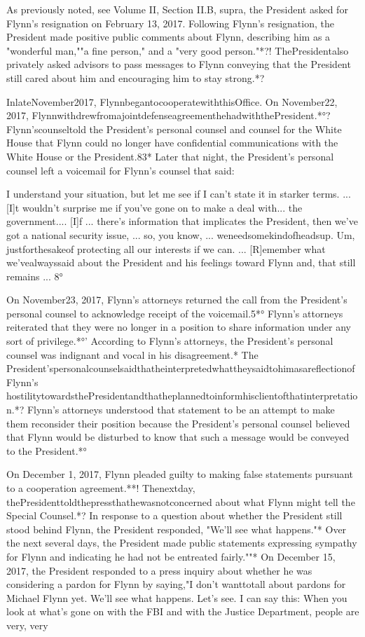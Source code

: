 As previously noted, see Volume II, Section II.B, supra, the President asked for Flynn's resignation on February 13, 2017.
Following Flynn's resignation, the President made positive public comments about Flynn, describing him as a "wonderful man,""a fine person," and a "very good person."*?!
ThePresidentalso privately asked advisors to pass messages to Flynn conveying that the President still cared about him and encouraging him to stay strong.*?

InlateNovember2017, FlynnbegantocooperatewiththisOffice. On November22, 2017, FlynnwithdrewfromajointdefenseagreementhehadwiththePresident.*°?
Flynn'scounseltold the President's personal counsel and counsel for the White House that Flynn could no longer have confidential communications with the White House or the President.83*
Later that night, the President's personal counsel left a voicemail for Flynn's counsel that said:

I understand your situation, but let me see if I can't state it in starker terms. ...
[I]t wouldn't surprise me if you've gone on to make a deal with... the government....
[I]f ... there's information that implicates the President, then we've got a national security issue, ... so, you know, ... weneedsomekindofheadsup.
Um, justforthesakeof protecting all our interests if we can. ...
[R]emember what we'vealwayssaid about the President and his feelings toward Flynn and, that still remains ... 8°

On November23, 2017, Flynn's attorneys returned the call from the President's personal counsel to acknowledge receipt of the voicemail.5*°
Flynn's attorneys reiterated that they were no longer in a position to share information under any sort of privilege.*°'
According to Flynn's attorneys, the President's personal counsel was indignant and vocal in his disagreement.*
The President'spersonalcounselsaidthatheinterpretedwhattheysaidtohimasareflectionofFlynn's hostilitytowardsthePresidentandthatheplannedtoinformhisclientofthatinterpretation.*?
Flynn's attorneys understood that statement to be an attempt to make them reconsider their position because the President's personal counsel believed that Flynn would be disturbed to know that such a message would be conveyed to the President.*°

On December 1, 2017, Flynn pleaded guilty to making false statements pursuant to a cooperation agreement.**!
Thenextday, thePresidenttoldthepressthathewasnotconcerned about what Flynn might tell the Special Counsel.*?
In response to a question about whether the President still stood behind Flynn, the President responded, "We'll see what happens."*
Over the next several days, the President made public statements expressing sympathy for Flynn and indicating he had not be entreated fairly.""*
On December 15, 2017, the President responded to a press inquiry about whether he was considering a pardon for Flynn by saying,"I don't wanttotall about pardons for Michael Flynn yet.
We'll see what happens.
Let's see.
I can say this: When you look at what's gone on with the FBI and with the Justice Department, people are very, very

